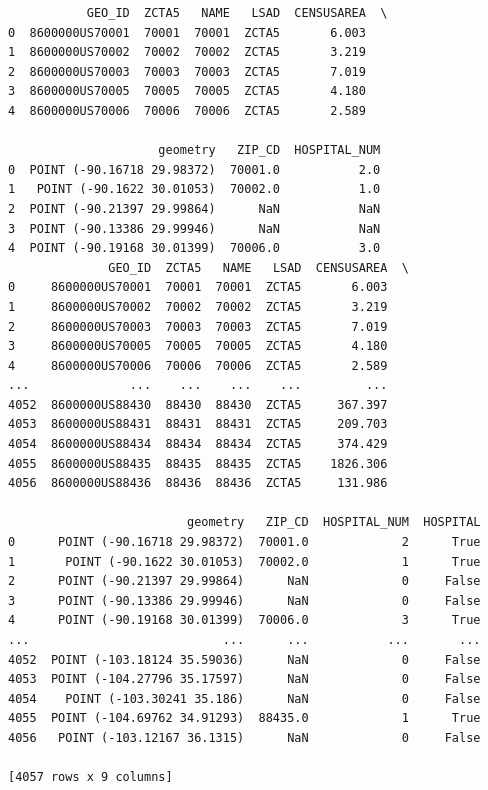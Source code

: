 \documentclass[
  letterpaper,
  DIV=11,
  numbers=noendperiod]{scrartcl}
\begin{document}
\begin{verbatim}
           GEO_ID  ZCTA5   NAME   LSAD  CENSUSAREA  \
0  8600000US70001  70001  70001  ZCTA5       6.003   
1  8600000US70002  70002  70002  ZCTA5       3.219   
2  8600000US70003  70003  70003  ZCTA5       7.019   
3  8600000US70005  70005  70005  ZCTA5       4.180   
4  8600000US70006  70006  70006  ZCTA5       2.589   

                     geometry   ZIP_CD  HOSPITAL_NUM  
0  POINT (-90.16718 29.98372)  70001.0           2.0  
1   POINT (-90.1622 30.01053)  70002.0           1.0  
2  POINT (-90.21397 29.99864)      NaN           NaN  
3  POINT (-90.13386 29.99946)      NaN           NaN  
4  POINT (-90.19168 30.01399)  70006.0           3.0  
              GEO_ID  ZCTA5   NAME   LSAD  CENSUSAREA  \
0     8600000US70001  70001  70001  ZCTA5       6.003   
1     8600000US70002  70002  70002  ZCTA5       3.219   
2     8600000US70003  70003  70003  ZCTA5       7.019   
3     8600000US70005  70005  70005  ZCTA5       4.180   
4     8600000US70006  70006  70006  ZCTA5       2.589   
...              ...    ...    ...    ...         ...   
4052  8600000US88430  88430  88430  ZCTA5     367.397   
4053  8600000US88431  88431  88431  ZCTA5     209.703   
4054  8600000US88434  88434  88434  ZCTA5     374.429   
4055  8600000US88435  88435  88435  ZCTA5    1826.306   
4056  8600000US88436  88436  88436  ZCTA5     131.986   

                         geometry   ZIP_CD  HOSPITAL_NUM  HOSPITAL  
0      POINT (-90.16718 29.98372)  70001.0             2      True  
1       POINT (-90.1622 30.01053)  70002.0             1      True  
2      POINT (-90.21397 29.99864)      NaN             0     False  
3      POINT (-90.13386 29.99946)      NaN             0     False  
4      POINT (-90.19168 30.01399)  70006.0             3      True  
...                           ...      ...           ...       ...  
4052  POINT (-103.18124 35.59036)      NaN             0     False  
4053  POINT (-104.27796 35.17597)      NaN             0     False  
4054    POINT (-103.30241 35.186)      NaN             0     False  
4055  POINT (-104.69762 34.91293)  88435.0             1      True  
4056   POINT (-103.12167 36.1315)      NaN             0     False  

[4057 rows x 9 columns]
\end{verbatim}
\end{document}
